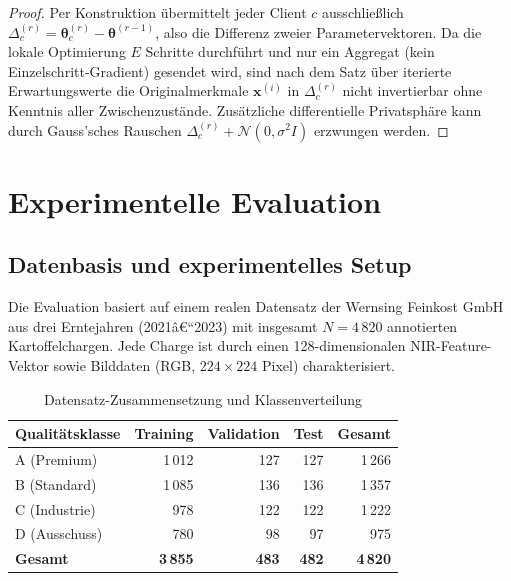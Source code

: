 \documentclass[a4paper, 12pt, twoside, openright]{report}
\theoremstyle{definition}
\theoremstyle{definition}
\begin{document}
\begin{proof}
	Per Konstruktion übermittelt jeder Client $c$ ausschließlich
	$\Delta_c^{(r)} = \boldsymbol{\theta}_c^{(r)} - \boldsymbol{\theta}^{(r-1)}$,
	also die Differenz zweier Parametervektoren. Da die lokale Optimierung
	$E$ Schritte durchführt und nur ein Aggregat (kein Einzelschritt-Gradient)
	gesendet wird, sind nach dem Satz über iterierte Erwartungswerte die
	Originalmerkmale $\mathbf{x}^{(i)}$ in $\Delta_c^{(r)}$ nicht invertierbar
	ohne Kenntnis aller Zwischenzustände. Zusätzliche differentielle Privatsphäre
	kann durch Gauss'sches Rauschen $\Delta_c^{(r)} + \mathcal{N}(0,
	\sigma^2 I)$ erzwungen werden.
\end{proof}


\section{Experimentelle Evaluation}


\subsection{Datenbasis und experimentelles Setup}

Die Evaluation basiert auf einem realen Datensatz der Wernsing Feinkost GmbH
aus drei Erntejahren (2021â€“2023) mit insgesamt $N = 4\,820$ annotierten
Kartoffelchargen. Jede Charge ist durch einen 128-dimensionalen NIR-Feature-Vektor
sowie Bilddaten (RGB, $224 \times 224$ Pixel) charakterisiert.

\begin{table}[H]
	\centering
	\caption{Datensatz-Zusammensetzung und Klassen\-verteilung}
	\label{tab:datensatz}
	\begin{tabular}{@{}lrrrr@{}}
		\toprule
		\textbf{Qualitätsklasse} & \textbf{Training} & \textbf{Validation} &
		\textbf{Test} & \textbf{Gesamt} \\
		\midrule
		A (Premium)  & 1\,012 & 127 & 127 & 1\,266 \\
		B (Standard) & 1\,085 & 136 & 136 & 1\,357 \\
		C (Industrie)& 978    & 122 & 122 & 1\,222 \\
		D (Ausschuss)& 780    &  98 &  97 &   975 \\
		\midrule
		\textbf{Gesamt} & \textbf{3\,855} & \textbf{483} & \textbf{482} &
		\textbf{4\,820} \\
		\bottomrule
	\end{tabular}
\end{table}
\end{document}

